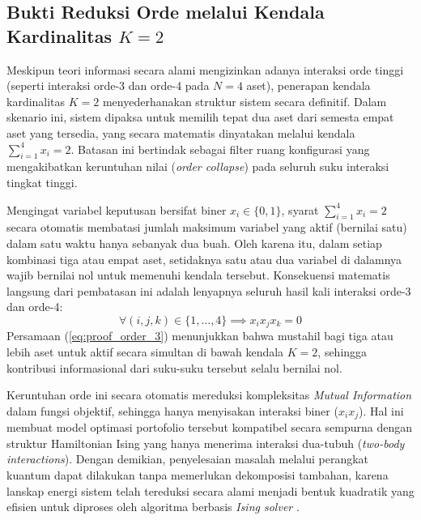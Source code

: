 \subsection{Bukti Reduksi Orde melalui Kendala Kardinalitas $K=2$}

Meskipun teori informasi secara alami mengizinkan adanya interaksi orde tinggi (seperti interaksi orde-3 dan orde-4 pada $N=4$ aset), penerapan kendala kardinalitas $K=2$ menyederhanakan struktur sistem secara definitif. Dalam skenario ini, sistem dipaksa untuk memilih tepat dua aset dari semesta empat aset yang tersedia, yang secara matematis dinyatakan melalui kendala $\sum_{i=1}^4 x_i = 2$. Batasan ini bertindak sebagai filter ruang konfigurasi yang mengakibatkan keruntuhan nilai (\textit{order collapse}) pada seluruh suku interaksi tingkat tinggi.

Mengingat variabel keputusan bersifat biner $x_i \in \{0, 1\}$, syarat $\sum_{i=1}^4 x_i = 2$ secara otomatis membatasi jumlah maksimum variabel yang aktif (bernilai satu) dalam satu waktu hanya sebanyak dua buah. Oleh karena itu, dalam setiap kombinasi tiga atau empat aset, setidaknya satu atau dua variabel di dalamnya wajib bernilai nol untuk memenuhi kendala tersebut. Konsekuensi matematis langsung dari pembatasan ini adalah lenyapnya seluruh hasil kali interaksi orde-3 dan orde-4:
\begin{equation}
\forall (i, j, k) \in \{1, \dots, 4\} \implies x_i x_j x_k = 0
\label{eq:proof_order_3}
\end{equation}
Persamaan (\ref{eq:proof_order_3}) menunjukkan bahwa mustahil bagi tiga atau lebih aset untuk aktif secara simultan di bawah kendala $K=2$, sehingga kontribusi informasional dari suku-suku tersebut selalu bernilai nol.

Keruntuhan orde ini secara otomatis mereduksi kompleksitas \textit{Mutual Information} dalam fungsi objektif, sehingga hanya menyisakan interaksi biner ($x_i x_j$). Hal ini membuat model optimasi portofolio tersebut kompatibel secara sempurna dengan struktur Hamiltonian Ising yang hanya menerima interaksi dua-tubuh (\textit{two-body interactions}). Dengan demikian, penyelesaian masalah melalui perangkat kuantum dapat dilakukan tanpa memerlukan dekomposisi tambahan, karena lanskap energi sistem telah tereduksi secara alami menjadi bentuk kuadratik yang efisien untuk diproses oleh algoritma berbasis \textit{Ising solver} \cite{menezes_ex_2025}.
